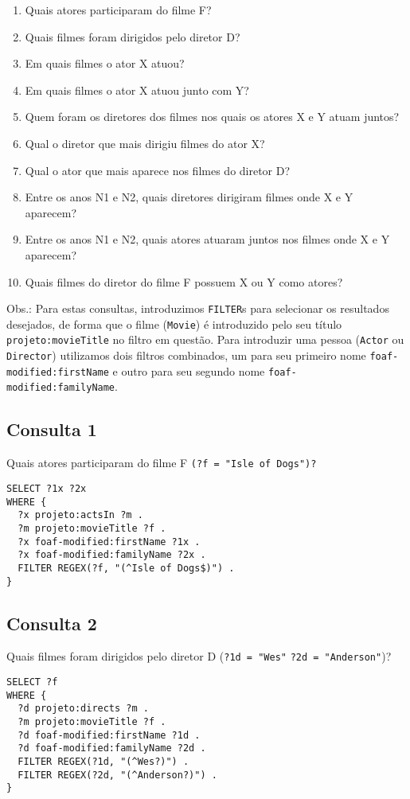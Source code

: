 \documentclass{article}
\newcommand{\code}[1]{\lstinline[mathescape=true]{#1}}
\begin{document}
\begin{enumerate}
  \item Quais atores participaram do filme F?
  \item Quais filmes foram dirigidos pelo diretor D?
  \item Em quais filmes o ator X atuou?
  \item Em quais filmes o ator X atuou junto com Y?
  \item Quem foram os diretores dos filmes nos quais os atores X e Y atuam juntos?
  \item Qual o diretor que mais dirigiu filmes do ator X?
  \item Qual o ator que mais aparece nos filmes do diretor D?
  \item Entre os anos N1 e N2, quais diretores dirigiram filmes onde X e Y aparecem?
  \item Entre os anos N1 e N2, quais atores atuaram juntos nos filmes onde X e Y aparecem?
  \item Quais filmes do diretor do filme F possuem X ou Y como atores?
\end{enumerate}

Obs.: Para estas consultas, introduzimos \code{FILTER}s para selecionar os resultados desejados, de forma que o filme (\code{Movie}) é introduzido pelo seu título \code{projeto:movieTitle} no filtro em questão. Para introduzir uma pessoa (\code{Actor} ou \code{Director}) utilizamos dois filtros combinados, um para seu primeiro nome \code{foaf-modified:firstName} e outro para seu segundo nome \code{foaf-modified:familyName}.
\subsection{Consulta 1}

Quais atores participaram do filme F \code{(?f = "Isle of Dogs")?}

\begin{lstlisting}[basicstyle=\ttfamily,frame=single]
SELECT ?1x ?2x
WHERE {
  ?x projeto:actsIn ?m .
  ?m projeto:movieTitle ?f .
  ?x foaf-modified:firstName ?1x .
  ?x foaf-modified:familyName ?2x .
  FILTER REGEX(?f, "(^Isle of Dogs$)") .
}
\end{lstlisting}
\subsection{Consulta 2}
Quais filmes foram dirigidos pelo diretor D (\code{?1d = "Wes"} \code{?2d = "Anderson"})?
\begin{lstlisting}[basicstyle=\ttfamily,frame=single]
SELECT ?f
WHERE {
  ?d projeto:directs ?m .
  ?m projeto:movieTitle ?f .
  ?d foaf-modified:firstName ?1d .
  ?d foaf-modified:familyName ?2d .
  FILTER REGEX(?1d, "(^Wes?)") .
  FILTER REGEX(?2d, "(^Anderson?)") .
}
\end{lstlisting}
\end{document}
